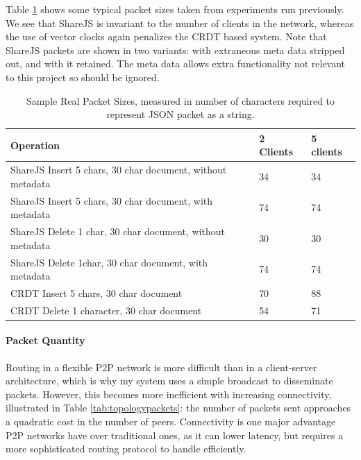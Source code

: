 \documentclass[12pt,a4paper,twoside,openright]{report}
\begin{document}
			Table \ref{tab:samplepacketsizes} shows some typical packet sizes taken from experiments run previously. We see that ShareJS is invariant to the number of clients in the network, whereas the use of vector clocks again penalizes the CRDT based system. Note that ShareJS packets are shown in two variants: with extraneous meta data stripped out, and with it retained. The meta data allows extra functionality not relevant to this project so should be ignored.
			
			\begin{table}[htb]
			\centering
			\caption[Sample Packet Sizes]{Sample Real Packet Sizes, measured in number of characters required to represent JSON packet as a string.}
			\label{tab:samplepacketsizes}
			\setlength{\tabcolsep}{12pt}
			\begin{tabular}{@{}lll@{}}
			Operation													   & 2 Clients & 5 clients \\ \toprule
			ShareJS Insert 5 chars, 30 char document, without metadata & 34        & 34        \\ \midrule
			ShareJS Insert 5 chars, 30 char document, with metadata    & 74        & 74        \\ \midrule
			ShareJS Delete 1 char, 30 char document, without metadata  & 30        & 30        \\ \midrule
			ShareJS Delete 1char, 30 char document, with metadata      & 74        & 74       \\ \midrule
			CRDT Insert 5 chars, 30 char document                      & 70        & 88        \\ \midrule
			CRDT Delete 1 character, 30 char document                  & 54        & 71        \\ \bottomrule

			\end{tabular}
			\end{table}
			
			
			
		\paragraph{Packet Quantity}
			Routing in a flexible P2P network is more difficult than in a client-server architecture, which is why my system uses a simple broadcast to disseminate packets. However, this becomes more inefficient with increasing connectivity, illustrated in Table \ref{tab:topologypackets}: the number of packets sent approaches a quadratic cost in the number of peers. Connectivity is one major advantage P2P networks have over traditional ones, as it can lower latency, but requires a more sophisticated routing protocol to handle efficiently.
			
\end{document}
